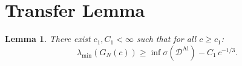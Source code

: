 \documentclass[12pt,a4paper]{amsart}
\newtheorem{lemma}[theorem]{Lemma}
\theoremstyle{definition}
\newcommand{\DAi}{\mathcal{D}^{\mathrm{Ai}}}
\newcommand{\GN}{G_N(c)}
\newcommand{\spec}{\sigma}
\begin{document}
\appendix

\section{Transfer Lemma}\label{app:transfer}

\begin{lemma}\label{lem:transfer}
There exist $c_1, C_1 < \infty$ such that for all $c \ge c_1$:
\begin{equation}\label{eq:transfer}
  \lambda_{\min}(\GN)
  \ge \inf\spec(\DAi) - C_1\, c^{-1/3}.
\end{equation}
\end{lemma}

\end{document}
